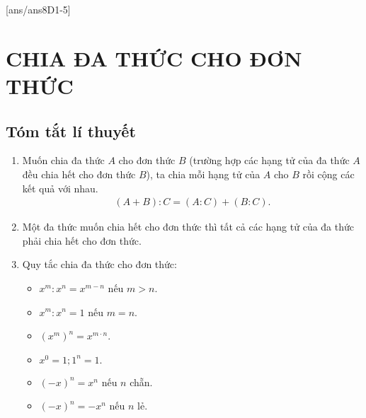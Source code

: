 [ans/ans8D1-5]
\section{CHIA ĐA THỨC CHO ĐƠN THỨC}
\subsection{Tóm tắt lí thuyết}
	\begin{enumerate}[\tickEX]
		\item Muốn chia đa thức $ A $ cho đơn thức $ B $ (trường hợp các hạng tử của đa thức $ A $ đều chia hết cho đơn thức $ B $), ta chia mỗi hạng tử của $ A $ cho $ B $ rồi cộng các kết quả với nhau. 
		\begin{eqnarray*}
			\left( A+B\right) : C = (A:C) + (B:C).
		\end{eqnarray*}
		\item Một đa thức muốn chia hết cho đơn thức thì tất cả các hạng tử của đa thức phải chia hết cho đơn thức.
		\item Quy tắc chia đa thức cho đơn thức:
\begin{itemize}
	\item $ x^m : x^n = x^{m-n} $ nếu $ m>n $.
	\item $ x^m : x^n = 1 $ nếu $ m=n $.
	\item $ \left(x^m \right)^n = x^{m\cdot n} $.
	\item $ x^0 = 1; 1^n = 1. $
	\item $ \left(-x \right)^n = x^n $ nếu $ n  $ chẵn.
	\item $ \left(-x \right)^n = -x^n $ nếu $ n  $ lẻ.
\end{itemize}		
	\end{enumerate}
